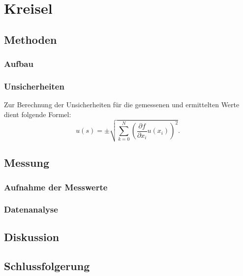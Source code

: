 \section{Kreisel} %

\subsection{Methoden}

	\subsubsection{Aufbau}
	
	\subsubsection{Unsicherheiten}
	
		Zur Berechnung der Unsicherheiten für die gemessenen und ermittelten Werte dient folgende Formel: 
		\begin{equation*}
		u(s) = \pm \sqrt{\sum_{k=0}^{N}\left( \frac{\partial f}{\partial x_i}u(x_i)\right) ^2}. \label{eq:kombUnsicherheit}
		\end{equation*}

\subsection{Messung}

	\subsubsection{Aufnahme der Messwerte}
	
	\subsubsection{Datenanalyse}	

\subsection{Diskussion}

\subsection{Schlussfolgerung}
